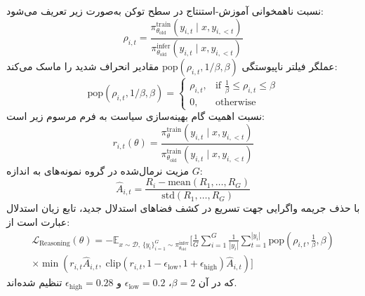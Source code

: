 نسبت ناهمخوانی آموزش-استنتاج در سطح توکن به‌صورت زیر تعریف می‌شود:
\begin{equation}
    \rho_{i,t} = \frac{\pi_{\theta_{\text{old}}}^{\text{train}}(y_{i,t} \mid x, y_{i,<t})}{\pi_{\theta_{\text{old}}}^{\text{infer}}(y_{i,t} \mid x, y_{i,<t})}
\end{equation}
عملگر فیلتر ناپیوستگی $\text{pop}(\rho_{i,t}, 1/\beta, \beta)$ مقادیر انحراف شدید را ماسک می‌کند:
\begin{equation}
    \text{pop}(\rho_{i,t}, 1/\beta, \beta) = \begin{cases} 
        \rho_{i,t}, & \text{if } \frac{1}{\beta} \le \rho_{i,t} \le \beta \\ 
        0, & \text{otherwise} 
    \end{cases}
\end{equation}
نسبت اهمیت گام بهینه‌سازی سیاست به فرم مرسوم زیر است:
\begin{equation}
    r_{i,t}(\theta) = \frac{\pi_\theta^{\text{train}}(y_{i,t} \mid x, y_{i,<t})}{\pi_{\theta_{\text{old}}}^{\text{train}}(y_{i,t} \mid x, y_{i,<t})}
\end{equation}
مزیت نرمال‌شده در گروه نمونه‌های به اندازه $G$:
\begin{equation}
    \hat{A}_{i,t} = \frac{R_i - \text{mean}(R_1, \dots, R_G)}{\text{std}(R_1, \dots, R_G)}
\end{equation}
با حذف جریمه واگرایی  جهت تسریع در کشف فضاهای استدلال جدید، تابع زیان استدلال  عبارت است از:
\begin{multline}
    \mathcal{L}_{\text{Reasoning}}(\theta) = -\mathbb{E}_{x \sim \mathcal{D}, \, \{y_i\}_{i=1}^G \sim \pi_{\theta_{\text{old}}}^{\text{infer}}} \Bigg[ \frac{1}{G} \sum_{i=1}^G \frac{1}{|y_i|} \sum_{t=1}^{|y_i|} \text{pop}\left(\rho_{i,t}, \frac{1}{\beta}, \beta\right) \\
    \times \min \left( r_{i,t}\hat{A}_{i,t}, \; \text{clip}(r_{i,t}, 1-\epsilon_{\text{low}}, 1+\epsilon_{\text{high}})\hat{A}_{i,t} \right) \Bigg]
\end{multline}
که در آن $\beta = 2$، $\epsilon_{\text{low}} = 0.2$ و $\epsilon_{\text{high}} = 0.28$ تنظیم شده‌اند.

